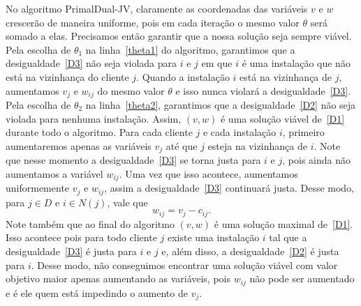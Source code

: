 No algoritmo {\sc PrimalDual-JV}, claramente as coordenadas das variáveis $v$ e $w$ crescerão de maneira uniforme, pois em cada iteração o mesmo valor $\theta$ será somado a elas. Precisamos então garantir que a nossa solução seja sempre viável. Pela escolha de $\theta_1$ na linha~\ref{theta1} do algoritmo, garantimos que a desigualdade~\eqref{D3} não seja violada para $i$ e $j$ em que $i$ é uma instalação que não está na vizinhança do cliente $j$. Quando a instalação $i$ está na vizinhança de $j$, aumentamos $v_j$ e $w_{ij}$ do mesmo valor $\theta$ e isso nunca violará a desigualdade~\eqref{D3}. 
Pela escolha de $\theta_2$ na linha~\ref{theta2}, garantimos que a desigualdade~\eqref{D2} não seja violada para nenhuma instalação. 
Assim, $(v,w)$ é uma solução viável de~\eqref{D1} durante todo o algoritmo.
Para cada cliente $j$ e cada instalação $i$, primeiro aumentaremos apenas as variáveis $v_j$ até que $j$ esteja na vizinhança de $i$. Note que nesse momento a desigualdade~\eqref{D3} se torna justa para $i$ e $j$, pois ainda não aumentamos a variável $w_{ij}$. Uma vez que isso acontece, aumentamos uniformemente $v_j$ e $w_{ij}$, assim a desigualdade~\eqref{D3} continuará justa. Desse modo, para $j \in D$ e $i \in N(j)$, vale que 
\begin{equation}\label{Djusta:*}  
w_{ij} = v_j - c_{ij}.
\end{equation}
Note também que ao final do algoritmo $(v,w)$ é uma solução maximal de~\eqref{D1}. Isso acontece pois para todo cliente $j$ existe uma instalação $i$ tal que a desigualdade~\eqref{D3} é justa para $i$ e $j$ e, além disso, a desigualdade~\eqref{D2} é justa para $i$. Desse modo, não conseguimos encontrar uma solução viável com valor objetivo maior apenas aumentando as variáveis, pois $w_{ij}$ não pode ser aumentado e é ele quem está impedindo o aumento de $v_j$.

